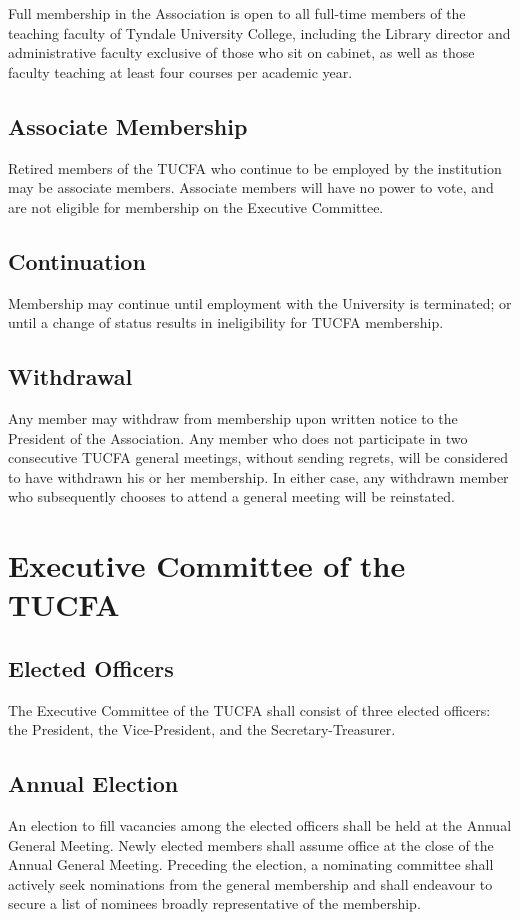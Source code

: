 \documentclass[12pt]{article}
\begin{document}
Full membership in the Association is open to all full-time members of the teaching faculty of Tyndale University College, including the Library director and administrative faculty exclusive of those who sit on cabinet, as well as those faculty teaching at least four courses per academic year.

\subsection{Associate Membership}
Retired members of the TUCFA who continue to be employed by the institution may be associate members. Associate members will have no power to vote, and are not eligible for membership on the Executive Committee.

\subsection{Continuation}
Membership may continue until employment with the University is terminated; or until a change of status results in ineligibility for TUCFA membership.

\subsection{Withdrawal}
Any member may withdraw from membership upon written notice to the President of the Association. Any member who does not participate in two consecutive TUCFA general meetings, without sending regrets, will be considered to have withdrawn his or her membership. In either case, any withdrawn member who subsequently chooses to attend a general meeting will be reinstated.

\section{Executive Committee of the TUCFA}

\subsection{Elected Officers}
The Executive Committee of the TUCFA shall consist of three elected officers: the President, the Vice-President, and the Secretary-Treasurer.

\subsection{Annual Election}
An election to fill vacancies among the elected officers shall be held at the Annual General Meeting. Newly elected members shall assume office at the close of the Annual General Meeting. Preceding the election, a nominating committee shall actively seek nominations from the general membership and shall endeavour to secure a list of nominees broadly representative of the membership.
\end{document}
